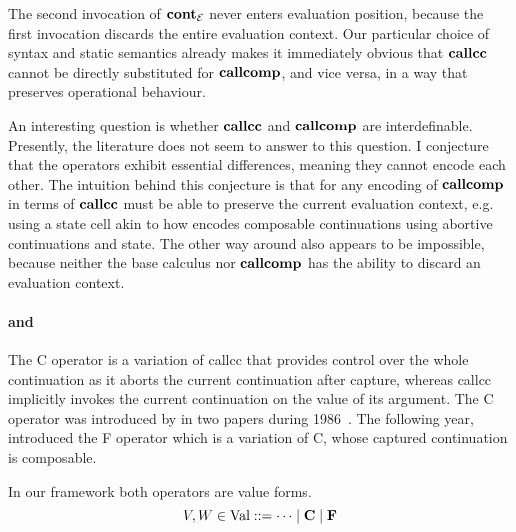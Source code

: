 \documentclass[12pt,phd,lfcs,twoside,openright,logo,leftchapter,normalheadings]{infthesis}
\theoremstyle{plain}
\theoremstyle{definition}
\begin{document}
%
The second invocation of $\mathbf{cont}_{\mathcal{E}}$ never enters evaluation position,
because the first invocation discards the entire evaluation context.
%
Our particular choice of syntax and static semantics already makes it
immediately obvious that $\mathbf{callcc}$ cannot be directly substituted for
$\mathbf{callcomp}$, and vice versa, in a way that preserves operational
behaviour. %

An interesting question is whether $\mathbf{callcc}$ and $\mathbf{callcomp}$ are
interdefinable. Presently, the literature does not seem to answer to
this question. I conjecture that the operators exhibit essential
differences, meaning they cannot encode each other.
%
The intuition behind this conjecture is that for any encoding of
$\mathbf{callcomp}$ in terms of $\mathbf{callcc}$ must be able to preserve the current
evaluation context, e.g. using a state cell akin to how
\citet{Filinski94} encodes composable continuations using abortive
continuations and state.
%
The other way around also appears to be impossible, because neither
the base calculus nor $\mathbf{callcomp}$ has the ability to discard an
evaluation context.
%

\paragraph{\FelleisenC{} and \FelleisenF{}}
%
The C operator is a variation of callcc that provides control over the
whole continuation as it aborts the current continuation after
capture, whereas callcc implicitly invokes the current continuation on
the value of its argument. The C operator was introduced by
\citeauthor{FelleisenFKD86} in two papers during
1986~\cite{FelleisenF86,FelleisenFKD86}. The following year,
\citet{FelleisenFDM87} introduced the F operator which is a variation
of C, whose captured continuation is composable.

In our framework both operators are value forms.
%
\[
  V,W \in \textrm{Val} ::= \cdots \mid \mathbf{C} \mid \mathbf{F}
\]
%
\end{document}
